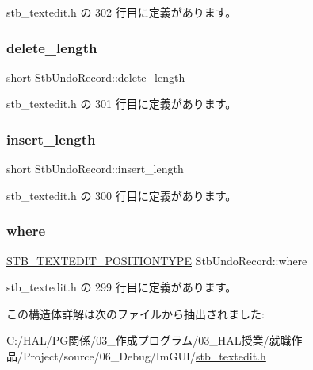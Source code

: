  stb\+\_\+textedit.\+h の 302 行目に定義があります。

\mbox{\label{struct_stb_undo_record_ad81789175cef417a0fe58204277fd735}} 
\subsubsection{\texorpdfstring{delete\+\_\+length}{delete\_length}}
{\footnotesize\ttfamily short Stb\+Undo\+Record\+::delete\+\_\+length}



 stb\+\_\+textedit.\+h の 301 行目に定義があります。

\mbox{\label{struct_stb_undo_record_ae2a3af79db791549db0c42263407cab5}} 
\subsubsection{\texorpdfstring{insert\+\_\+length}{insert\_length}}
{\footnotesize\ttfamily short Stb\+Undo\+Record\+::insert\+\_\+length}



 stb\+\_\+textedit.\+h の 300 行目に定義があります。

\mbox{\label{struct_stb_undo_record_a49e87adbb75a18ffba1f853ac974b31d}} 
\subsubsection{\texorpdfstring{where}{where}}
{\footnotesize\ttfamily \mbox{\hyperlink{stb__textedit_8h_a5d0c1b8751b6517e3d817f2a025ed654}{S\+T\+B\+\_\+\+T\+E\+X\+T\+E\+D\+I\+T\+\_\+\+P\+O\+S\+I\+T\+I\+O\+N\+T\+Y\+PE}} Stb\+Undo\+Record\+::where}



 stb\+\_\+textedit.\+h の 299 行目に定義があります。



この構造体詳解は次のファイルから抽出されました\+:\begin{DoxyCompactItemize}
\item 
C\+:/\+H\+A\+L/\+P\+G関係/03\+\_\+作成プログラム/03\+\_\+\+H\+A\+L授業/就職作品/\+Project/source/06\+\_\+\+Debug/\+Im\+G\+U\+I/\mbox{\hyperlink{stb__textedit_8h}{stb\+\_\+textedit.\+h}}\end{DoxyCompactItemize}
